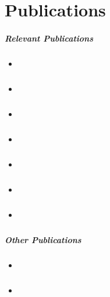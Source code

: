 \chapter{Publications} 

\paragraph{Relevant Publications}

\begin{itemize}
  \item \cite{KieferM14b} 
  \item \cite{KieferM14a} 
  \item \cite{KieferM15a} 
  \item \cite{KieferM15b} 
  \item \cite{KieferM15c} 
  \item \cite{DongK15a} 
  \item \cite{opake} 
\end{itemize}

\paragraph{Other Publications}

\begin{itemize}
  \item \cite{FGKMP2013} 
  \item \cite{BHK2013} 
\end{itemize}
